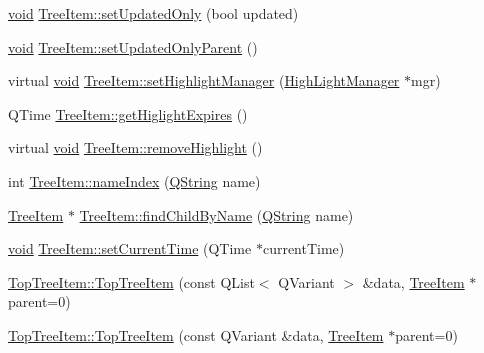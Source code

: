 \begin{DoxyCompactItemize}
\item 
\hyperlink{group___u_a_v_objects_plugin_ga444cf2ff3f0ecbe028adce838d373f5c}{void} \hyperlink{group___u_a_v_object_browser_plugin_ga63e16f896af89aa165dcd9c31d42ce83}{\-Tree\-Item\-::set\-Updated\-Only} (bool updated)
\item 
\hyperlink{group___u_a_v_objects_plugin_ga444cf2ff3f0ecbe028adce838d373f5c}{void} \hyperlink{group___u_a_v_object_browser_plugin_gae74eb4785ae705b5a9ffc056a71fb88a}{\-Tree\-Item\-::set\-Updated\-Only\-Parent} ()
\item 
virtual \hyperlink{group___u_a_v_objects_plugin_ga444cf2ff3f0ecbe028adce838d373f5c}{void} \hyperlink{group___u_a_v_object_browser_plugin_gac523fe360648e1e148c4b30f6918c6be}{\-Tree\-Item\-::set\-Highlight\-Manager} (\hyperlink{class_high_light_manager}{\-High\-Light\-Manager} $\ast$mgr)
\item 
\-Q\-Time \hyperlink{group___u_a_v_object_browser_plugin_gabc3b5a703ec23600e388018db3349369}{\-Tree\-Item\-::get\-Higlight\-Expires} ()
\item 
virtual \hyperlink{group___u_a_v_objects_plugin_ga444cf2ff3f0ecbe028adce838d373f5c}{void} \hyperlink{group___u_a_v_object_browser_plugin_ga9620f3abc5fda75861a24032594766a6}{\-Tree\-Item\-::remove\-Highlight} ()
\item 
int \hyperlink{group___u_a_v_object_browser_plugin_gac2b731cbaed396ea1819b12ddb0f7767}{\-Tree\-Item\-::name\-Index} (\hyperlink{group___u_a_v_objects_plugin_gab9d252f49c333c94a72f97ce3105a32d}{\-Q\-String} name)
\item 
\hyperlink{class_tree_item}{\-Tree\-Item} $\ast$ \hyperlink{group___u_a_v_object_browser_plugin_ga17e124da1542c7dab530add7dce6d170}{\-Tree\-Item\-::find\-Child\-By\-Name} (\hyperlink{group___u_a_v_objects_plugin_gab9d252f49c333c94a72f97ce3105a32d}{\-Q\-String} name)
\item 
\hyperlink{group___u_a_v_objects_plugin_ga444cf2ff3f0ecbe028adce838d373f5c}{void} \hyperlink{group___u_a_v_object_browser_plugin_ga2d8b58f0944b4a2b934f1aacc5188f17}{\-Tree\-Item\-::set\-Current\-Time} (\-Q\-Time $\ast$current\-Time)
\item 
\hyperlink{group___u_a_v_object_browser_plugin_gaf9396b0e4b1f80d5d2eb271a4421aad9}{\-Top\-Tree\-Item\-::\-Top\-Tree\-Item} (const \-Q\-List$<$ \-Q\-Variant $>$ \&data, \hyperlink{class_tree_item}{\-Tree\-Item} $\ast$parent=0)
\item 
\hyperlink{group___u_a_v_object_browser_plugin_ga5c9d07784db08b50ef3905d2628f61e4}{\-Top\-Tree\-Item\-::\-Top\-Tree\-Item} (const \-Q\-Variant \&data, \hyperlink{class_tree_item}{\-Tree\-Item} $\ast$parent=0)

\end{DoxyCompactItemize}

